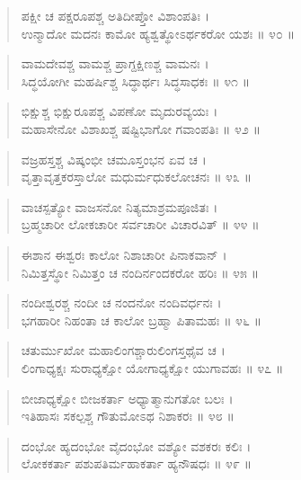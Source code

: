 \begin{verse}
ಪಕ್ಷೀ ಚ ಪಕ್ಷರೂಪಶ್ಚ ಅತಿದೀಪ್ತೋ ವಿಶಾಂಪತಿಃ ।\\ಉನ್ಮಾದೋ ಮದನಃ ಕಾಮೋ ಹ್ಯಶ್ವತ್ಥೋಽರ್ಥಕರೋ ಯಶಃ \num{॥ ೪೦ ॥}
\end{verse}

\begin{verse}
ವಾಮದೇವಶ್ಚ ವಾಮಶ್ಚ ಪ್ರಾಗ್ದಕ್ಷಿಣಶ್ಚ ವಾಮನಃ ।\\ಸಿದ್ಧಯೋಗೀ ಮಹರ್ಷಿಶ್ಚ ಸಿದ್ಧಾರ್ಥಃ ಸಿದ್ಧಸಾಧಕಃ \num{॥ ೪೧ ॥}
\end{verse}

\begin{verse}
ಭಿಕ್ಷುಶ್ಚ ಭಿಕ್ಷುರೂಪಶ್ಚ ವಿಪಣೋ ಮೃದುರವ್ಯಯಃ ।\\ಮಹಾಸೇನೋ ವಿಶಾಖಶ್ಚ ಷಷ್ಟಿಭಾಗೋ ಗವಾಂಪತಿಃ \num{॥ ೪೨ ॥}
\end{verse}

\begin{verse}
ವಜ್ರಹಸ್ತಶ್ಚ ವಿಷ್ಕಂಭೀ ಚಮೂಸ್ತಂಭನ ಏವ ಚ ।\\ವೃತ್ತಾವೃತ್ತಕರಸ್ತಾಲೋ ಮಧುರ್ಮಧುಕಲೋಚನಃ \num{॥ ೪೩ ॥}
\end{verse}

\begin{verse}
ವಾಚಸ್ಪತ್ಯೋ ವಾಜಸನೋ ನಿತ್ಯಮಾಶ್ರಮಪೂಜಿತಃ ।\\ಬ್ರಹ್ಮಚಾರೀ ಲೋಕಚಾರೀ ಸರ್ವಚಾರೀ ವಿಚಾರವಿತ್ \num{॥ ೪೪ ॥}
\end{verse}

\begin{verse}
ಈಶಾನ ಈಶ್ವರಃ ಕಾಲೋ ನಿಶಾಚಾರೀ ಪಿನಾಕವಾನ್ ।\\ನಿಮಿತ್ತಸ್ಥೋ ನಿಮಿತ್ತಂ ಚ ನಂದಿರ್ನಂದಕರೋ ಹರಿಃ \num{॥ ೪೫ ॥}
\end{verse}

\begin{verse}
ನಂದೀಶ್ವರಶ್ಚ ನಂದೀ ಚ ನಂದನೋ ನಂದಿವರ್ಧನಃ ।\\ಭಗಹಾರೀ ನಿಹಂತಾ ಚ ಕಾಲೋ ಬ್ರಹ್ಮಾ ಪಿತಾಮಹಃ \num{॥ ೪೬ ॥}
\end{verse}

\begin{verse}
ಚತುರ್ಮುಖೋ ಮಹಾಲಿಂಗಶ್ಚಾರುಲಿಂಗಸ್ತಥೈವ ಚ ।\\ಲಿಂಗಾಧ್ಯಕ್ಷಃ ಸುರಾಧ್ಯಕ್ಷೋ ಯೋಗಾಧ್ಯಕ್ಷೋ ಯುಗಾವಹಃ \num{॥ ೪೭ ॥}
\end{verse}

\begin{verse}
ಬೀಜಾಧ್ಯಕ್ಷೋ ಬೀಜಕರ್ತಾ ಅಧ್ಯಾತ್ಮಾನುಗತೋ ಬಲಃ ।\\ಇತಿಹಾಸಃ ಸಕಲ್ಪಶ್ಚ ಗೌತುಮೋಽಥ ನಿಶಾಕರಃ \num{॥ ೪೮ ॥}
\end{verse}

\begin{verse}
ದಂಭೋ ಹ್ಯದಂಭೋ ವೈದಂಭೋ ವಶ್ಯೋ ವಶಕರಃ ಕಲಿಃ ।\\ಲೋಕಕರ್ತಾ ಪಶುಪತಿರ್ಮಹಾಕರ್ತಾ ಹ್ಯನೌಷಧಃ \num{॥ ೪೯ ॥}
\end{verse}

